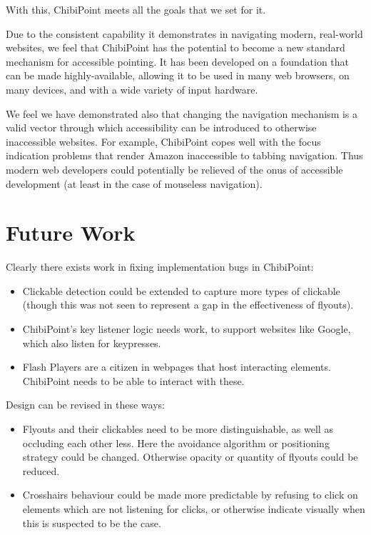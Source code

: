 \documentclass[a4paper, 12pt]{report}
\begin{document}
With this, ChibiPoint meets all the goals that we set for it.

Due to the consistent capability it demonstrates in navigating modern, real-world websites, we feel that ChibiPoint has the potential to become a new standard mechanism for accessible pointing. It has been developed on a foundation that can be made highly-available, allowing it to be used in many web browsers, on many devices, and with a wide variety of input hardware.

We feel we have demonstrated also that changing the navigation mechanism is a valid vector through which accessibility can be introduced to otherwise inaccessible websites. For example, ChibiPoint copes well with the focus indication problems that render Amazon inaccessible to tabbing navigation. Thus modern web developers could potentially be relieved of the onus of accessible development (at least in the case of mouseless navigation).

\section{Future Work}
Clearly there exists work in fixing implementation bugs in ChibiPoint:

\begin{itemize}
\item Clickable detection could be extended to capture more types of clickable (though this was not 
seen to represent a gap in the effectiveness of flyouts).
\item ChibiPoint's key listener logic needs work, to support websites like Google, which also listen for keypresses.
\item Flash Players are a citizen in webpages that host interacting elements. ChibiPoint needs to be able to interact with these.
\end{itemize}

Design can be revised in these ways:
\begin{itemize}
\item Flyouts and their clickables need to be more distinguishable, as well as occluding each other less. Here the avoidance algorithm or positioning strategy could be changed. Otherwise opacity or quantity of flyouts could be reduced.
\item Crosshairs behaviour could be made more predictable by refusing to click on elements which are not listening for clicks, or otherwise indicate visually when this is suspected to be the case.
\end{itemize}
\end{document}
